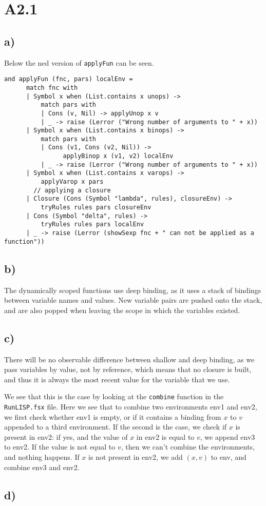 \section*{A2.1}
\subsection*{a)}
Below the ned version of \texttt{applyFun} can be seen.
\begin{verbatim}
and applyFun (fnc, pars) localEnv =
      match fnc with
      | Symbol x when (List.contains x unops) ->
          match pars with
          | Cons (v, Nil) -> applyUnop x v
          | _ -> raise (Lerror ("Wrong number of arguments to " + x))
      | Symbol x when (List.contains x binops) ->
          match pars with
          | Cons (v1, Cons (v2, Nil)) ->
                applyBinop x (v1, v2) localEnv
          | _ -> raise (Lerror ("Wrong number of arguments to " + x))
      | Symbol x when (List.contains x varops) ->
          applyVarop x pars
        // applying a closure
      | Closure (Cons (Symbol "lambda", rules), closureEnv) ->
          tryRules rules pars closureEnv
      | Cons (Symbol "delta", rules) ->
          tryRules rules pars localEnv
      | _ -> raise (Lerror (showSexp fnc + " can not be applied as a function"))
\end{verbatim}

\subsection*{b)}
The dynamically scoped functions use deep binding, as it uses a stack of bindings between variable names and values. New variable pairs are pushed onto the stack, and are also popped when leaving the scope in which the variables existed.

\subsection*{c)}
There will be no observable difference between shallow and deep binding, as we pass variables by value, not by reference, which means that no closure is built, and thus it is always the most recent value for the variable that we use.

We see that this is the case by looking at the \texttt{combine} function in the \texttt{RunLISP.fsx} file. Here we see that to combine two environments env1 and env2, we first check whether env1 is empty, or if it contains a binding from $x$ to $v$ appended to a third environment. If the second is the case, we check if $x$ is present in env2: if yes, and the value of $x$ in env2 is equal to $v$, we append env3 to env2. If the value is not equal to $v$, then we can't combine the environments, and nothing happens. If $x$ is not present in env2, we add $(x,v)$ to env, and combine env3 and env2.

\subsection*{d)}
